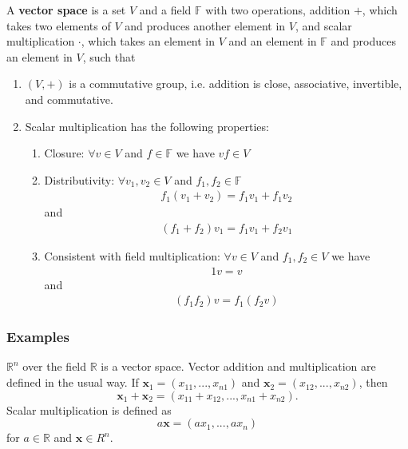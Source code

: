 \documentclass[compress]{beamer}
\def\F{\mathbb{F}}
\def\R{\mathbb{R}}
\begin{document}
\begin{frame}

\begin{definition}
  A \textbf{vector space} is a set $V$ and a field $\mathbb{F}$ with
  two operations, addition $+$, which takes two elements of $V$ and
  produces another element in $V$, and scalar multiplication $\cdot$,
  which takes an element in $V$ and an element in $\mathbb{F}$ and
  produces an element in $V$, such that
  \begin{enumerate}
  \item $(V, +)$ is a commutative group, i.e. addition is close,
    associative, invertible, and commutative.
  \item Scalar multiplication has the following properties:
    \begin{enumerate}
    \item Closure: $\forall v \in V$ and $f \in \F$ we have $vf \in V$
    \item Distributivity: $\forall v_1 , v_2 \in V$ and $f_1, f_2 \in
      \F$
      \begin{align*}
        f_1 (v_1 + v_2) = f_1 v_1 + f_1 v_2 
      \end{align*}
      and 
      \begin{align*}
        (f_1 + f_2)v_1 = f_1 v_1 + f_2 v_1
      \end{align*}
    \item Consistent with field multiplication: $\forall v \in V$ and
      $f_1, f_2 \in V$ we have
      \begin{align*}
        1 v = v
      \end{align*}
      and 
      \begin{align*}
        (f_1 f_2) v =f_1 (f_2 v)
      \end{align*}
    \end{enumerate}
  \end{enumerate}  
\end{definition}
\end{frame}

\subsubsection{Examples}
\begin{frame}
  \begin{example}\label{ex:Rn}
    $\R^n$ over the field $\R$ is a vector space.  Vector addition and
    multiplication are defined in the usual way. If $\mathbf{x}_1 =
    (x_{11}, ..., x_{n1})$ and $\mathbf{x}_2 = (x_{12}, ..., x_{n2})$,
    then
    \[ \mathbf{x}_1 + \mathbf{x}_2 = (x_{11}+x_{12}, ... , x_{n1} +
    x_{n2}). \]
    Scalar multiplication is defined as
    \[ a \mathbf{x} = (a x_1, ..., ax_n) \] for $a \in \R$ and
    $\mathbf{x} \in R^n$. 
  \end{example}
\end{frame}
\end{document}
